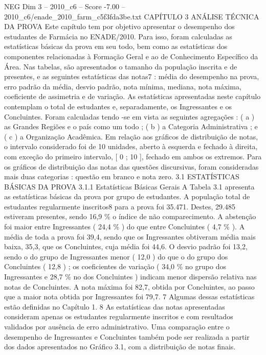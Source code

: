 \begin{textsample}{NEG Dim 3 – 2010\_c6 – Score -7.00 – 2010\_c6/enade\_2010\_farm\_c5f3fda3be.txt}  \label{ex:f3_neg_010}
CAPÍTULO 3 ANÁLISE TÉCNICA DA PROVA Este capítulo tem por objetivo apresentar o desempenho dos estudantes de Farmácia no ENADE/2010.
Para isso, foram calculadas as estatísticas básicas da prova em seu todo, bem como as estatísticas dos componentes relacionadas à Formação Geral e ao de Conhecimento Específico da Área.
Nas tabelas, são apresentados o tamanho da população inscrita e de presentes, e as seguintes estatísticas das notas7 : média do desempenho na prova, erro padrão da média, desvio padrão, nota mínima, mediana, nota máxima, coeficiente de assimetria e de variação.
As estatísticas apresentadas neste capítulo contemplam o total de estudantes e, separadamente, os Ingressantes e os Concluintes.
Foram calculadas tendo -se em vista as seguintes agregações : ( a ) as Grandes Regiões e o país como um todo ; ( b ) a Categoria Administrativa ; e ( c ) a Organização Acadêmica.
Em relação aos gráficos de distribuição de notas, o intervalo considerado foi de 10 unidades, aberto à esquerda e fechado à direita, com exceção do primeiro intervalo, [ 0 ; 10 ], fechado em ambos os extremos.
Para os gráficos de distribuição das notas das questões discursivas, foram consideradas mais duas categorias : questão em branco e nota zero. 3.1 ESTATÍSTICAS BÁSICAS DA PROVA 3.1.1 Estatísticas Básicas Gerais A Tabela 3.1 apresenta as estatísticas básicas da prova por grupo de estudantes.
A população total de estudantes regularmente inscritos8 para a prova foi 35.471.
Destes, 29.485 estiveram presentes, sendo 16,9 \% o índice de não comparecimento.
A abstenção foi maior entre Ingressantes ( 24,4 \% ) do que entre Concluintes ( 4,7 \% ).
A média de toda a prova foi 39,4, sendo que os Ingressantes obtiveram média mais baixa, 35,3, que os Concluintes, cuja média foi 44,6.
O desvio padrão foi 13,2, sendo o do grupo de Ingressantes menor ( 12,0 ) do que o do grupo dos Concluintes ( 12,8 ) ; os coeficientes de variação ( 34,0 \% no grupo dos Ingressantes e 28,7 \% no dos Concluintes ) indicam menor dispersão relativa nas notas de Concluintes.
A nota máxima foi 82,7, obtida por Concluintes, ao passo que a maior nota obtida por Ingressantes foi 79,7. 7 Algumas dessas estatísticas estão definidas no Capítulo 1. 8 As estatísticas das notas apresentadas consideram apenas os estudantes regularmente inscritos e com resultados validados por ausência de erro administrativo.
Uma comparação entre o desempenho de Ingressantes e Concluintes também pode ser realizada a partir dos dados apresentados no Gráfico 3.1, com a distribuição de notas finais.

\end{textsample}
